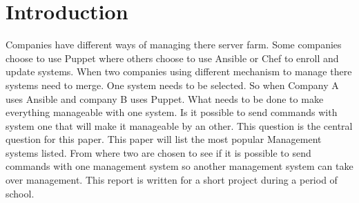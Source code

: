 \section{Introduction}\label{sec:introduction}

Companies have different ways of managing there server farm. Some companies choose to use Puppet\cite{whatispuppet} where others choose to use Ansible\cite{whatisansible} or Chef \cite{whatischef} to enroll and update systems. When two companies using different mechanism to manage there systems need to merge. One system needs to be selected. So when Company A uses Ansible and company B uses Puppet. What needs to be done to make everything manageable with one system. Is it possible to send commands with system one that will make it manageable by an other. This question is the central question for this paper. This paper will list the most popular Management systems listed. From where two are chosen to see if it is possible to send commands with one management system so another management system can take over management. This report is written for a short project during a period of school. 
  
